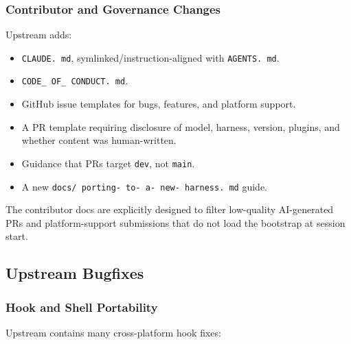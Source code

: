 \documentclass[twocolumn,10pt,letterpaper]{article}
\begin{document}
\subsubsection{Contributor and Governance Changes}

Upstream adds:


\begin{itemize}
\setlength{\itemsep}{0pt}
\setlength{\parskip}{0pt}
  \item \texttt{CLAUDE. md}, symlinked/instruction-aligned with \texttt{AGENTS. md}.
  \item \texttt{CODE\_ OF\_ CONDUCT. md}.
  \item GitHub issue templates for bugs, features, and platform support.
  \item A PR template requiring disclosure of model, harness, version, plugins, and whether content was human-written.
  \item Guidance that PRs target \texttt{dev}, not \texttt{main}.
  \item A new \texttt{docs/ porting- to- a- new- harness. md} guide.
\end{itemize}

The contributor docs are explicitly designed to filter low-quality AI-generated PRs and platform-support submissions that do not load the bootstrap at session start.


\subsection{Upstream Bugfixes}

\subsubsection{Hook and Shell Portability}

Upstream contains many cross-platform hook fixes:
\end{document}
